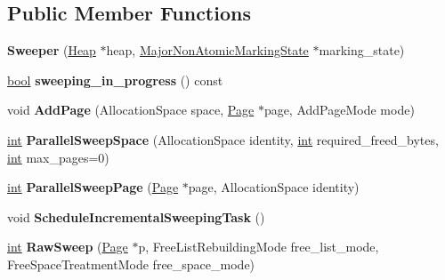 \subsection*{Public Member Functions}
\begin{DoxyCompactItemize}
\item 
\mbox{\label{classv8_1_1internal_1_1Sweeper_abf8cbaa16bd25d3071d8746acbf97014}} 
{\bfseries Sweeper} (\mbox{\hyperlink{classv8_1_1internal_1_1Heap}{Heap}} $\ast$heap, \mbox{\hyperlink{classv8_1_1internal_1_1MajorNonAtomicMarkingState}{Major\+Non\+Atomic\+Marking\+State}} $\ast$marking\+\_\+state)
\item 
\mbox{\label{classv8_1_1internal_1_1Sweeper_a01bad92ed163322fda20e965bec9e19e}} 
\mbox{\hyperlink{classbool}{bool}} {\bfseries sweeping\+\_\+in\+\_\+progress} () const
\item 
\mbox{\label{classv8_1_1internal_1_1Sweeper_ad8f6f5ec90bd98f416befe59d48aa881}} 
void {\bfseries Add\+Page} (Allocation\+Space space, \mbox{\hyperlink{classv8_1_1internal_1_1Page}{Page}} $\ast$page, Add\+Page\+Mode mode)
\item 
\mbox{\label{classv8_1_1internal_1_1Sweeper_a68b65d0255f44c25445dffa4fd19fddb}} 
\mbox{\hyperlink{classint}{int}} {\bfseries Parallel\+Sweep\+Space} (Allocation\+Space identity, \mbox{\hyperlink{classint}{int}} required\+\_\+freed\+\_\+bytes, \mbox{\hyperlink{classint}{int}} max\+\_\+pages=0)
\item 
\mbox{\label{classv8_1_1internal_1_1Sweeper_a599809ad833aaaeb76b9ea32818c522e}} 
\mbox{\hyperlink{classint}{int}} {\bfseries Parallel\+Sweep\+Page} (\mbox{\hyperlink{classv8_1_1internal_1_1Page}{Page}} $\ast$page, Allocation\+Space identity)
\item 
\mbox{\label{classv8_1_1internal_1_1Sweeper_a35d028f98c47f6097c52072e0ed6c597}} 
void {\bfseries Schedule\+Incremental\+Sweeping\+Task} ()
\item 
\mbox{\label{classv8_1_1internal_1_1Sweeper_a823d43ecf65cb253154da171439b3a2e}} 
\mbox{\hyperlink{classint}{int}} {\bfseries Raw\+Sweep} (\mbox{\hyperlink{classv8_1_1internal_1_1Page}{Page}} $\ast$p, Free\+List\+Rebuilding\+Mode free\+\_\+list\+\_\+mode, Free\+Space\+Treatment\+Mode free\+\_\+space\+\_\+mode)

\end{DoxyCompactItemize}
